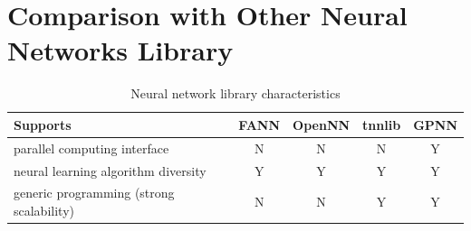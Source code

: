 \documentclass[procedia]{easychair}
\begin{document}
\appendix

\section{Comparison with Other Neural Networks Library}
\label{appendix:comparison}

\begin{table}[htp]
    \centering
    \caption{Neural network library characteristics}
    \begin{tabular}{ >{\centering}m{3cm} c c c c }
        \hline \hline
        Supports & FANN & OpenNN & tnnlib & GPNN \\
        \hline
        parallel computing interface & N & N & N & Y \\
        \hline 
        neural learning algorithm diversity & Y & Y & Y & Y \\
        \hline
        generic programming (strong scalability) & N & N & Y & Y \\
        \hline \hline
    \end{tabular}
    \label{table:library_compare}
\end{table}




\end{document}
